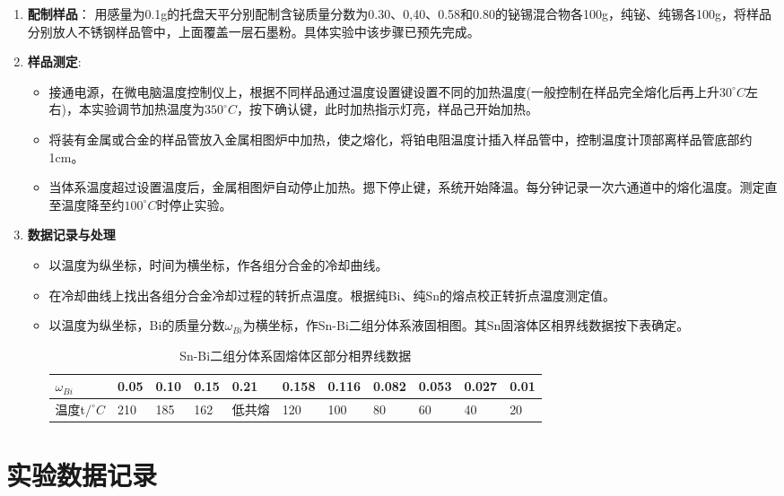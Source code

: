 \documentclass[12pt,hyperref,a4paper,UTF8]{ctexart}
\begin{document}
\begin{enumerate}
    \item \textbf{配制样品}：
    用感量为0.1g的托盘天平分别配制含铋质量分数为0.30、0,40、0.58和0.80的铋锡混合物各100g，纯铋、纯锡各100g，将样品分别放人不锈钢样品管中，上面覆盖一层石墨粉。具体实验中该步骤已预先完成。
    \item \textbf{样品测定}:
    \begin{itemize}
        \item 接通电源，在微电脑温度控制仪上，根据不同样品通过温度设置键设置不同的加热温度(一般控制在样品完全熔化后再上升$30^{\circ}C$左右)，本实验调节加热温度为$350^{\circ}C$，按下确认键，此时加热指示灯亮，样品己开始加热。
        \item 将装有金属或合金的样品管放入金属相图炉中加热，使之熔化，将铂电阻温度计插入样品管中，控制温度计顶部离样品管底部约1cm。
        \item 当体系温度超过设置温度后，金属相图炉自动停止加热。摁下停止键，系统开始降温。每分钟记录一次六通道中的熔化温度。测定直至温度降至约$100^{\circ}C$时停止实验。
    \end{itemize}
    \item \textbf{数据记录与处理}
    \begin{itemize}
        \item 以温度为纵坐标，时间为横坐标，作各组分合金的冷却曲线。
        \item 在冷却曲线上找出各组分合金冷却过程的转折点温度。根据纯Bi、纯Sn的熔点校正转折点温度测定值。
        \item 以温度为纵坐标，Bi的质量分数$\omega_{Bi}$为横坐标，作Sn-Bi二组分体系液固相图。其Sn固溶体区相界线数据按下表确定。
        \begin{table}[htp]
        \centering
        \caption{Sn-Bi二组分体系固熔体区部分相界线数据}
\begin{tabular}{|l|l|l|l|l|l|l|l|l|l|l|}
\hline
$\omega_{Bi}$ & 0.05 & 0.10 & 0.15 & 0.21  & 0.158 & 0.116 & 0.082 & 0.053 & 0.027 & 0.01 \\ \hline
温度t$/^{\circ}C$ & 210  & 185  & 162  & 低共熔 & 120   & 100   & 80    & 60    & 40    & 20   \\ \hline
\end{tabular}
\end{table}
    \end{itemize}
\end{enumerate}

\clearpage

\section{实验数据记录}
\end{document}
